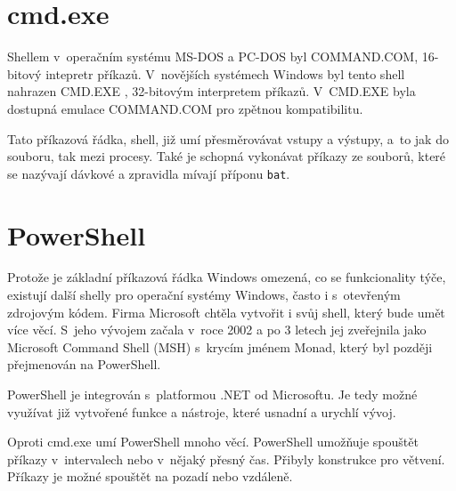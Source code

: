 \documentclass[thesis=M,czech]{FITthesis}[2012/06/26]
\begin{document}



\section{cmd.exe}

Shellem v~operačním systému MS-DOS a PC-DOS byl COMMAND.COM, 16-bitový intepretr příkazů. V~novějších systémech Windows byl tento shell nahrazen CMD.EXE \cite{windowsshell}, 32-bitovým interpretem příkazů. V~CMD.EXE byla dostupná emulace COMMAND.COM pro zpětnou kompatibilitu.

Tato příkazová řádka, shell, již umí přesměrovávat vstupy a výstupy, a~to jak do souboru, tak mezi procesy. Také je schopná vykonávat příkazy ze souborů, které se nazývají dávkové a zpravidla mívají příponu \texttt{bat}.



\section{PowerShell}

Protože je základní příkazová řádka Windows omezená, co se funkcionality týče, existují další shelly pro operační systémy Windows, často i s~otevřeným zdrojovým kódem. Firma Microsoft chtěla vytvořit i svůj shell, který bude umět více věcí. S~jeho vývojem začala v~roce 2002 a po 3 letech jej zveřejnila jako Microsoft Command Shell (MSH) s~krycím jménem Monad, který byl později přejmenován na PowerShell.

PowerShell je integrován s~platformou .NET \cite{windowsdotnet} od Microsoftu. Je tedy možné využívat již vytvořené funkce a nástroje, které usnadní a urychlí vývoj.

Oproti cmd.exe umí PowerShell mnoho věcí. PowerShell umožňuje spouštět příkazy v~intervalech nebo v~nějaký přesný čas. Přibyly konstrukce pro větvení. Příkazy je možné spouštět na pozadí nebo vzdáleně.


\end{document}

